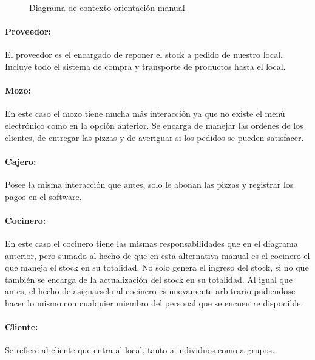\documentclass[a4paper,10pt]{article}
\begin{document}
\begin{figure}[H]
\centering
{}
\caption{Diagrama de contexto orientación manual.}
\end{figure}

\paragraph{Proveedor:}
El proveedor es el encargado de reponer el stock a pedido de nuestro local. Incluye todo el sistema de compra y transporte de productos hasta el local.
\\

\paragraph{Mozo:}
En este caso el mozo tiene mucha m\'as interacci\'on ya que no existe el men\'u electr\'onico como en la opci\'on anterior. Se encarga de manejar las ordenes de los clientes, de entregar las pizzas y de averiguar si los pedidos se pueden satisfacer.
\\

\paragraph{Cajero:}
Posee la misma interacci\'on que antes, solo le abonan las pizzas y registrar los pagos en el software.
\\

\paragraph{Cocinero:}
En este caso el cocinero tiene las mismas responsabilidades que en el diagrama anterior, pero sumado al hecho de que en esta alternativa manual es el cocinero el que maneja el stock en su totalidad. No solo genera el ingreso del stock, si no que tambi\'en se encarga de la actualizaci\'on del stock en su totalidad. Al igual que antes, el hecho de asignarselo al cocinero es nuevamente arbitrario pudiendose hacer lo mismo con cualquier miembro del personal que se encuentre disponible.
\\

\paragraph{Cliente:}
Se refiere al cliente que entra al local, tanto a individuos como a grupos.
\\
\end{document}
